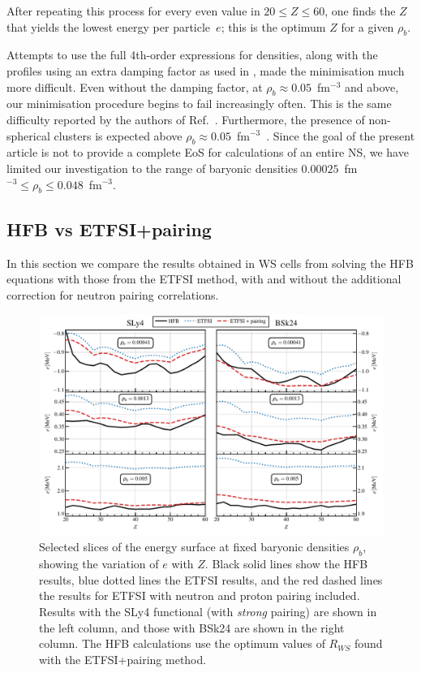 \documentclass[
    amsmath,amssymb,
    aps,
    prc,
    floatfix,
]{revtex4-2}
\begin{document}
After repeating this process for every even value in $20\leq Z\leq60$, one finds the $Z$ that yields the lowest energy per particle~$e$; this is the optimum $Z$ for a given $\rho_b$. 

Attempts to use the full 4th-order expressions for densities, along with the profiles using an extra damping factor as used in \cite{onsi2008semi,pearsonInnerCrustNeutron2012,pearsonUnifiedEquationsState2018}, made the minimisation much more difficult. Even without the damping factor, at $\rho_b\approx0.05$~fm$^{-3}$ and above, our minimisation procedure begins to fail increasingly often. This is the same difficulty reported by the authors of Ref.~\cite{pearsonInnerCrustNeutron2012}. Furthermore, the presence of non-spherical clusters is expected above $\rho_b\approx0.05$~fm$^{-3}$~\cite{pearsonUnifiedEquationsState2020}. Since the goal of the present article is not to provide a complete EoS for calculations of an entire NS, we have limited our investigation to the range of baryonic densities $0.00025$~fm$^{-3}\leq\rho_b\leq0.048$~fm$^{-3}$.


\subsection{HFB vs ETFSI+pairing}

In this section we compare the results obtained in WS cells from solving the HFB equations with those from the ETFSI method, with and without the additional correction for neutron pairing correlations.

   \begin{figure}
        \centering
        \includegraphics{figs/slices_SLy4_BSk24.pdf}
        \caption{Selected slices of the energy surface at fixed baryonic densities $\rho_b$, showing the variation of $e$ with $Z$. Black solid lines show the HFB results, blue dotted lines the ETFSI results, and the red dashed lines the results for ETFSI with neutron and proton pairing included. Results with the SLy4 functional (with \emph{strong} pairing) are shown in the left column, and those with BSk24 are shown in the right column. The HFB calculations use the optimum values of $R_{WS}$ found with the ETFSI+pairing method.}
        \label{fig:etf_hfb_slices}
    \end{figure}
\end{document}
